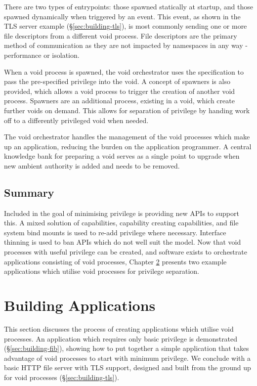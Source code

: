 \documentclass[12pt,a4paper,twoside]{report}
\begin{document}
There are two types of entrypoints: those spawned statically at startup, and those spawned dynamically when triggered by an event. This event, as shown in the TLS server example (§\ref{sec:building-tls}), is most commonly sending one or more file descriptors from a different void process. File descriptors are the primary method of communication as they are not impacted by namespaces in any way - performance or isolation.

When a void process is spawned, the void orchestrator uses the specification to pass the pre-specified privilege into the void. A concept of spawners is also provided, which allows a void process to trigger the creation of another void process. Spawners are an additional process, existing in a void, which create further voids on demand. This allows for separation of privilege by handing work off to a differently privileged void when needed.

The void orchestrator handles the management of the void processes which make up an application, reducing the burden on the application programmer. A central knowledge bank for preparing a void serves as a single point to upgrade when new ambient authority is added and needs to be removed.

\section{Summary}

Included in the goal of minimising privilege is providing new APIs to support this. A mixed solution of capabilities, capability creating capabilities, and file system bind mounts is used to re-add privilege where necessary. Interface thinning is used to ban APIs which do not well suit the model. Now that void processes with useful privilege can be created, and software exists to orchestrate applications consisting of void processes, Chapter \ref{chap:building-apps} presents two example applications which utilise void processes for privilege separation.


\chapter{Building Applications}
\label{chap:building-apps}

This section discusses the process of creating applications which utilise void processes. An application which requires only basic privilege is demonstrated (§\ref{sec:building-fib}), showing how to put together a simple application that takes advantage of void processes to start with minimum privilege. We conclude with a basic HTTP file server with TLS support, designed and built from the ground up for void processes (§\ref{sec:building-tls}).
\end{document}
